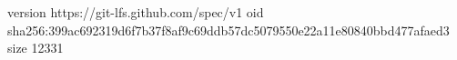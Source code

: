 version https://git-lfs.github.com/spec/v1
oid sha256:399ac692319d6f7b37f8af9c69ddb57dc5079550e22a11e80840bbd477afaed3
size 12331
